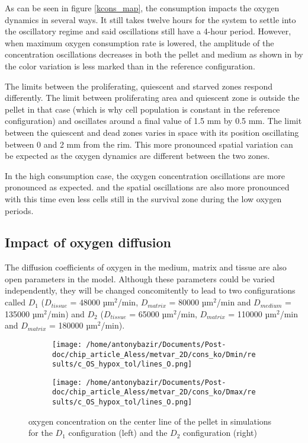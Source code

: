 \documentclass[11pt,a4paper]{article}
\begin{document}
As can be seen in figure \ref{kcons_map}, the consumption impacts the oxygen dynamics in several ways. It still takes twelve hours for the system to settle into the oscillatory regime and said oscillations still have a 4-hour period. However, when maximum oxygen consumption rate is lowered, the amplitude of the concentration oscillations decreases in both the pellet and medium as shown in by the color variation is less marked than in the reference configuration.

The limits between the proliferating, quiescent and starved zones respond differently. The limit between proliferating area and quiescent zone is outside the pellet in that case (which is why cell population is constant in the reference configuration) and oscillates around a final value of 1.5 mm by  0.5 mm. The limit between the quiescent and dead zones varies in space with its position oscillating between 0 and 2 mm from the rim. This more pronounced spatial variation can be expected as the oxygen dynamics are different between the two zones.

In the high consumption case, the oxygen concentration oscillations are more pronounced as expected. and the spatial oscillations are also more pronounced  with this time even less cells still in the survival zone during the low oxygen periods.

\subsection{Impact of oxygen diffusion}
The diffusion coefficients of oxygen in the medium, matrix and tissue are also open parameters in the model. Although these parameters could be varied independently, they will be changed concomitently to lead to two configurations called $D_{1}$ ($D_{tissue}$ = 48000 µm$^2$/min, $D_{matrix}$ = 80000 µm$^2$/min and $D_{medium}$ = 135000 µm$^2$/min) and $D_{2}$ ($D_{tissue}$ = 65000 µm$^2$/min, $D_{matrix}$ = 110000 µm$^2$/min and $D_{matrix}$ = 180000 µm$^2$/min).

\begin{figure}[ht!]
\begin{subfigure}{0.44\textwidth}
	\centering
	\texttt{[image: /home/antonybazir/Documents/Post-doc/chip\_article\_Aless/metvar\_2D/cons\_ko/Dmin/results/c\_OS\_hypox\_tol/lines\_O.png]}
\end{subfigure}
\begin{subfigure}{0.44\textwidth}
	\centering
	\texttt{[image: /home/antonybazir/Documents/Post-doc/chip\_article\_Aless/metvar\_2D/cons\_ko/Dmax/results/c\_OS\_hypox\_tol/lines\_O.png]}
\end{subfigure}
\caption{oxygen concentration on the center line of the pellet in simulations for the $D_{1}$ configuration (left) and the $D_{2}$ configuration (right)  \label{Dminmax_map}}
\end{figure}
\end{document}
